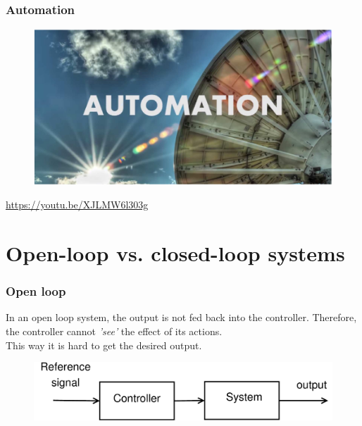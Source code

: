 \begin{frame}
	\frametitle{Automation}
	\begin{figure}
		\includegraphics[width=1\linewidth]{automation}
	\end{figure}
	\url{https://youtu.be/XJLMW6l303g}
\end{frame}

\section{Open-loop vs. closed-loop systems} 

\begin{frame}
	\frametitle{Open loop}
	\vspace{-4ex}
	In an open loop system, the output is not fed back into the controller. Therefore, the controller cannot \textit{'see'} the effect of its actions. \\
	This way it is hard to get the desired output.\\
	\bigskip
	\begin{figure}
		\includegraphics[width=1\linewidth]{open_loop}
	\end{figure}
\end{frame}

